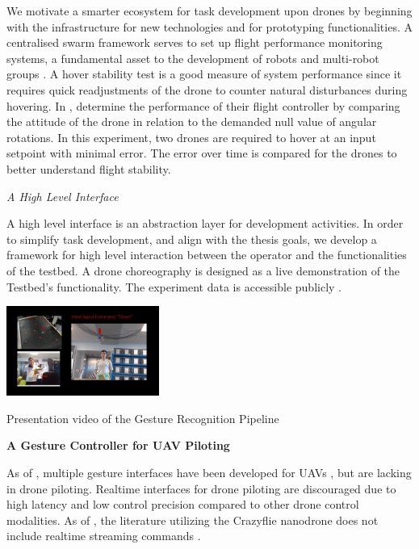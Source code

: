 We motivate a smarter ecosystem for task development upon drones by beginning with the infrastructure for new technologies and for prototyping functionalities. A centralised swarm framework serves to set up flight performance monitoring systems, a fundamental asset to the development of robots and multi-robot groups \cite{gcs_validation}. 
A hover stability test is a good measure of system performance since it requires quick readjustments of the drone to counter natural disturbances during hovering. In \cite{experimental_tuning},  determine the performance of their flight controller by comparing the attitude of the drone in relation to the demanded null value of angular rotations. In this experiment, two drones are required to hover at an input setpoint with minimal error. The error over time is compared for the drones to better understand flight stability.


\textit{A High Level Interface}

A high level interface is an abstraction layer for development activities. In order to simplify task development, and align with the thesis goals, we develop a framework for high level interaction between the operator and the functionalities of the testbed.
A drone choreography is designed as a live demonstration of the Testbed's functionality. The experiment data is accessible publicly \cite{choreography_data}.

\begin{marginfigure}%
    \raggedright
    \includegraphics[width=5cm]{images/Signal_Mode.JPG}
    \caption{Presentation video \cite{piloting_video} of the Gesture Recognition Pipeline}
\end{marginfigure}
\textbf{}

\textbf{A Gesture Controller for UAV Piloting}

As of , multiple gesture interfaces have been developed for UAVs \cite{liu_szirányi_2021} \cite{gesture_interface}, but are lacking in drone piloting. Realtime interfaces for drone piloting are discouraged \cite{tezza_andujar_2019} due to high latency and low control precision compared to other drone control modalities. As of , the literature utilizing the Crazyflie nanodrone does not include realtime streaming commands \cite{crazyflie_research}. 

